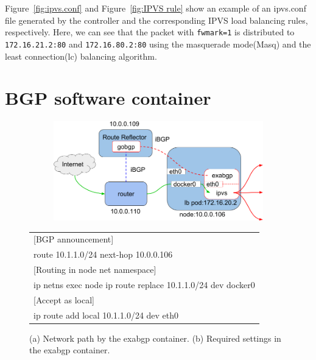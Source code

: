 Figure~\ref{fig:ipvs.conf} and Figure~\ref{fig:IPVS rule} show an example of an ipvs.conf file 
generated by the controller and the corresponding IPVS load balancing rules, respectively.
Here, we can see that the packet with {\tt fwmark=1}\cite{BertHubert2002} is distributed 
to {\tt 172.16.21.2:80} and {\tt 172.16.80.2:80} 
using the masquerade mode(Masq) and 
the least connection(lc)\cite{Zhang2000} balancing algorithm.


\section{BGP software container}

\begin{figure}[tb]

  \begin{subfigure}[t]{\columnwidth}
    \includegraphics[width=0.9\columnwidth]{Figs/exabgp}
    \caption{}
    \label{fig:exabgp_schem}
  \end{subfigure}

  \par\bigskip

  \begin{subtable}{.9\textwidth}
    \centering
    \begin{tabular}{l}
      \hline 
      \multicolumn{1}{l}{[BGP announcement]} \\
      \hspace{15 mm} route 10.1.1.0/24 next-hop 10.0.0.106 \\
      \multicolumn{1}{l}{[Routing in node net namespace]} \\
      \hspace{15 mm} ip netns exec node ip route replace 10.1.1.0/24 dev docker0 \\
      \multicolumn{1}{l}{[Accept as local]} \\
      \hspace{15 mm} ip route add local 10.1.1.0/24 dev eth0 \\
      \hline
    \end{tabular}
    \caption{}
    \label{tab:single}
  \end{subtable}

  \caption{
    (a) Network path by the exabgp container. (b) Required settings in the exabgp container.
  }
  \label{fig:exabgp}
\end{figure}

